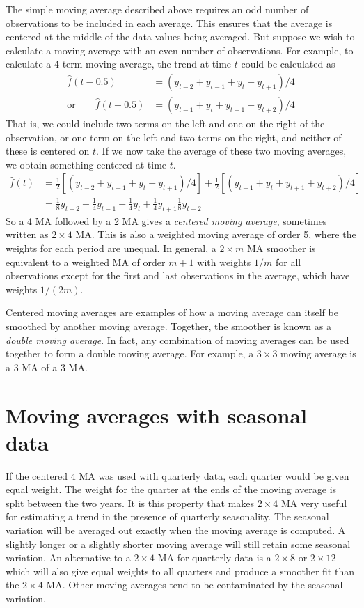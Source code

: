 \documentclass[a4paper,10pt]{article}
\newcommand{\smfrac}[2]{{\scriptstyle\frac{#1}{#2}}}
\begin{document}
The simple moving average described above requires an odd number of observations to be included in each average. This ensures that the average is centered at the middle of the data values being averaged. But suppose we wish to calculate a moving average with an even number of observations. For example, to calculate a 4-term moving average, the trend at time $t$ could be calculated as
\begin{align*}
	\hat{f}(t-0.5) & = (y_{t-2} + y_{t-1} + y_t + y_{t+1})/4   \\
	\text{or}\qquad
	\hat{f}(t+0.5) & = (y_{t-1} + y_{t} + y_{t+1} + y_{t+2})/4
\end{align*}
That is, we could include two terms on the left and one on the right of the observation, or one term on the left and two terms on the right, and neither of these is centered on $t$. If we now take the average of these two moving averages, we obtain something centered at time $t$.
\begin{align*}
	\hat{f}(t) & = \smfrac12\left[ (y_{t-2} + y_{t-1} + y_t + y_{t+1})/4\right] + \smfrac12\left[(y_{t-1} + y_{t} + y_{t+1} + y_{t+2})/4\right] \\
	           & = \smfrac18 y_{t-2} + \smfrac14 y_{t-1} + \smfrac14 y_t + \smfrac14 y_{t+1} \smfrac18 y_{t+2}
\end{align*}
So a 4 MA followed by a 2 MA gives a \textit{centered moving average}, sometimes written as $2\times4$ MA. This is also a weighted moving average of order 5, where the weights for each period are unequal. In general, a $2\times m$ MA smoother is equivalent to a weighted MA of order $m+1$ with weights $1/m$ for all observations except for the first and last observations in the average, which have weights $1/(2m)$.

Centered moving averages are examples of how a moving average can itself be smoothed by another moving average. Together, the smoother is known as a \emph{double moving average}. In fact, any combination of moving averages can be used together to form a double moving average. For example, a $3\times3$ moving average is a 3 MA of a 3 MA.

\section{Moving averages with seasonal data}

If the centered 4 MA was used with quarterly data, each quarter would be given equal weight. The weight for the quarter at the ends of the moving average is split between the two years. It is this property that makes $2\times4$ MA very useful for estimating a trend in the presence of quarterly seasonality. The seasonal variation will be averaged out exactly when the moving average is computed. A slightly longer or a slightly shorter moving average will still retain some seasonal variation. An alternative to a $2\times4$ MA for quarterly data is a $2\times8$ or $2\times12$ which will also give equal weights to all quarters and produce a smoother fit than the $2\times4$ MA.
Other moving averages tend to be contaminated by the seasonal variation.
\end{document}
